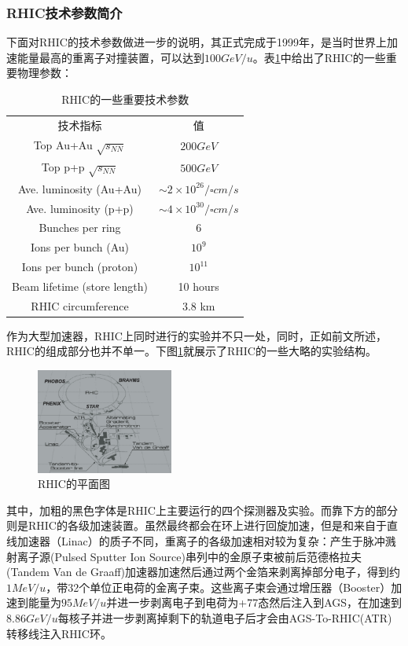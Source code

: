 \documentclass[%
 reprint,
 amsmath,amssymb,
 aps,
]{revtex4-1}
\begin{document}
\subsubsection{\label{sec:RHICSpec}RHIC技术参数简介}
下面对RHIC的技术参数做进一步的说明，其正式完成于1999年，是当时世界上加速能量最高的重离子对撞装置，可以达到$100\si{GeV/u}$。表\ref{tab:RhicSpec}中给出了RHIC的一些重要物理参数：
\begin{table}[htbp]
    \centering
    \caption{\label{tab:RhicSpec}RHIC的一些重要技术参数}
    \begin{ruledtabular}
    \begin{tabular}{cc}
    技术指标&值  \\
    \colrule
    Top Au+Au $\sqrt{s_{NN}}$&$200 \si{GeV}$ \\
    Top p+p $\sqrt{s_{NN}}$&$500 \si{GeV}$ \\
    Ave. luminosity (Au+Au) & $\sim 2\times10^{26}\si{\per \square cm \per s}$ \\
    Ave. luminosity (p+p) & $\sim 4\times10^{30}\si{\per \square cm \per s}$ \\ 
    Bunches per ring & 6 \\
    Ions per bunch (Au) & $10^9$ \\
    Ions per bunch (proton) & $10^{11}$ \\
    Beam lifetime (store length) & 10 hours\\
    RHIC circumference & 3.8 km
    \end{tabular}
    \end{ruledtabular}
\end{table}

作为大型加速器，RHIC上同时进行的实验并不只一处，同时，正如前文所述，RHIC的组成部分也并不单一。下图\ref{fig:RHIC}就展示了RHIC的一些大略的实验结构。
\begin{figure}[htbp]
    \includegraphics[width=0.4\textwidth]{Plots/RHIC.png}
    \caption{\label{fig:RHIC}RHIC的平面图}
\end{figure}
其中，加粗的黑色字体是RHIC上主要运行的四个探测器及实验。而靠下方的部分则是RHIC的各级加速装置。虽然最终都会在环上进行回旋加速，但是和来自于直线加速器（Linac）的质子不同，重离子的各级加速相对较为复杂：产生于脉冲溅射离子源(Pulsed Sputter Ion Source)串列中的金原子束被前后范德格拉夫(Tandem Van de Graaff)加速器加速然后通过两个金箔来剥离掉部分电子，得到约$1\si{MeV/u}$，带32个单位正电荷的金离子束。这些离子束会通过增压器（Booster）加速到能量为$95\si{MeV/u}$并进一步剥离电子到电荷为+77态然后注入到AGS，在加速到$8.86\si{GeV/u}$每核子并进一步剥离掉剩下的轨道电子后才会由AGS-To-RHIC(ATR)转移线注入RHIC环。
\end{document}
